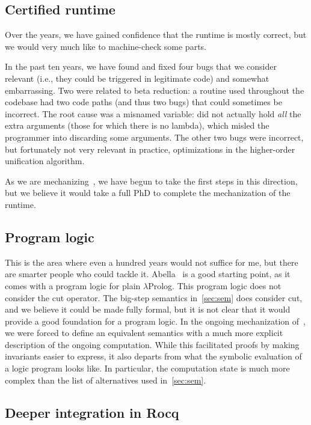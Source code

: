 \documentclass[a4paper, 11pt]{book}
\begin{document}
\subsection{Certified runtime}

Over the years, we have gained confidence that the runtime is mostly correct,
but we would very much like to machine-check some parts.

In the past ten years, we have found and fixed four bugs that we consider
relevant (i.e., they could be triggered in legitimate code) and somewhat
embarrassing. Two were related to beta reduction: a routine used throughout the
codebase had two code paths (and thus two bugs) that could sometimes be
incorrect. The root cause was a misnamed variable:  did not
actually hold \emph{all} the extra arguments (those for which there is no
lambda), which misled the programmer into discarding some arguments. The other
two bugs were incorrect, but fortunately not very relevant in practice,
optimizations in the higher-order unification algorithm.

As we are mechanizing~\cite{elpidet}, we have begun to take the first steps in
this direction, but we believe it would take a full PhD to complete the
mechanization of the runtime.

\subsection{Program logic}

This is the area where even a hundred years would not suffice for me, but there
are smarter people who could tackle it. Abella~\cite{abella} is a good starting
point, as it comes with a program logic for plain $\lambda$Prolog. This program
logic does not consider the cut operator. The big-step semantics
in~\ref{sec:sem} does consider cut, and we believe it could be made fully
formal, but it is not clear that it would provide a good foundation for a
program logic. In the ongoing mechanization of~\cite{elpidet}, we were forced
to define an equivalent semantics with a much more explicit description of the
ongoing computation. While this facilitated proofs by making invariants easier
to express, it also departs from what the symbolic evaluation of a logic
program looks like. In particular, the computation state is much more complex
than the list of alternatives used in~\ref{sec:sem}.

\subsection{Deeper integration in Rocq}
\end{document}
